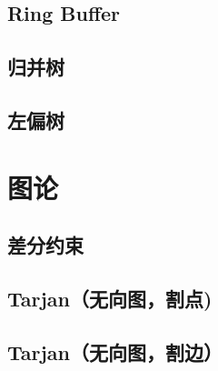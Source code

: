 \documentclass[12pt]{article}
\theoremstyle{definition}
\theoremstyle{remark}
\begin{document}
\newpage

\subsection{Ring Buffer}



\newpage

\subsection{归并树}



\newpage

\subsection{左偏树}



\newpage

{\centering\section{图论}}

\subsection{差分约束}



\newpage

\subsection{Tarjan（无向图，割点)}



\newpage

\subsection{Tarjan（无向图，割边）}



\newpage
\end{document}
